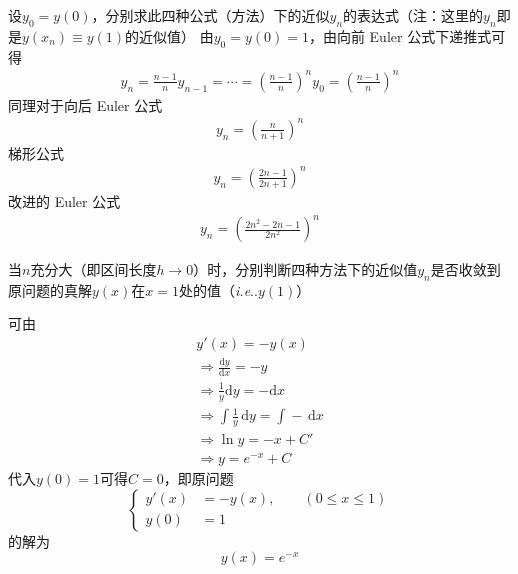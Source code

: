 \documentclass[11pt]{article}
\makeatletter
\DeclareRobustCommand\onedot{\futurelet\@let@token\@onedot}
\def\@onedot{\ifx\@let@token.\else.\null\fi\xspace}
\def\ie{\emph{i.e}\onedot}
\makeatother
\begin{document}
\begin{question}
\begin{subquestion}{设$y_0 = y(0)$，分别求此四种公式（方法）下的近似$y_n$的表达式（注：这里的$y_n$即是$y(x_n) \equiv y(1)$的近似值）}
        \answer
        {
            由$y_0 = y(0) = 1$，由向前 Euler 公式下递推式可得
            \begin{align*}
                y_{n} = \frac{n - 1}{n}y_{n - 1} = \cdots = \left(\frac{n - 1}{n}\right)^{n}y_{0} = \left(\frac{n - 1}{n}\right)^{n}
            \end{align*}
            同理对于向后 Euler 公式
            \begin{align*}
                y_{n} = \left(\frac{n}{n + 1}\right)^{n}
            \end{align*}
            梯形公式
            \begin{align*}
                y_{n} = \left(\frac{2n - 1}{2n + 1}\right)^{n}
            \end{align*}
            改进的 Euler 公式
            \begin{align*}
                y_{n} = \left(\frac{2n^2 - 2n - 1}{2n^2}\right)^{n}
            \end{align*}
        }
    \end{subquestion}
    \begin{subquestion}{当$n$充分大（即区间长度$h \rightarrow 0$）时，分别判断四种方法下的近似值$y_n$是否收敛到原问题的真解$y(x)$在$x = 1$处的值（\ie $y(1)$）}
        \answer
        {

            可由
            \begin{align*}
                y'(x) = -y(x)                                                 \\
                \Rightarrow \frac{\text{d}y}{\text{d}x} = -y                  \\
                \Rightarrow \frac{1}{y}\text{d}y = -\text{d}x                 \\
                \Rightarrow \int\!\frac{1}{y}\,\text{d}y = \int\!-\,\text{d}x \\
                \Rightarrow \ln y = -x + C'                                   \\
                \Rightarrow y = e^{-x} + C
            \end{align*}
            代入$y(0) = 1$可得$C = 0$，即原问题
            \begin{equation*}
                \left\{
                \begin{aligned}
                    y'(x) & = - y(x) ,\qquad (0 \leqslant x \leqslant 1) \\
                    y(0)  & = 1
                \end{aligned}
                \right.
            \end{equation*}
            的解为
            \begin{equation*}
                y(x) = e^{-x}
            \end{equation*}

}
\end{subquestion}
\end{question}
\end{document}
